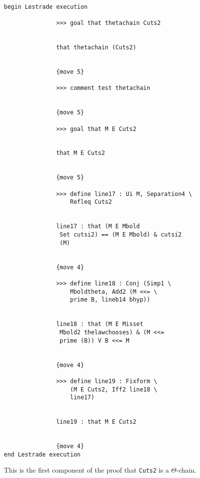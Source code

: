 \documentclass[12pt]{article}
\begin{document}
\begin{verbatim}

begin Lestrade execution

               >>> goal that thetachain Cuts2


               that thetachain (Cuts2)


               {move 5}

               >>> comment test thetachain


               {move 5}

               >>> goal that M E Cuts2


               that M E Cuts2


               {move 5}

               >>> define line17 : Ui M, Separation4 \
                   Refleq Cuts2


               line17 : that (M E Mbold 
                Set cutsi2) == (M E Mbold) & cutsi2 
                (M)


               {move 4}

               >>> define line18 : Conj (Simp1 \
                   Mboldtheta, Add2 (M <<= \
                   prime B, lineb14 bhyp))


               line18 : that (M E Misset 
                Mbold2 thelawchooses) & (M <<= 
                prime (B)) V B <<= M


               {move 4}

               >>> define line19 : Fixform \
                   (M E Cuts2, Iff2 line18 \
                   line17)


               line19 : that M E Cuts2


               {move 4}
end Lestrade execution
\end{verbatim}

This is the first component of the proof that {\tt Cuts2} is a $\Theta$-chain.
\end{document}
